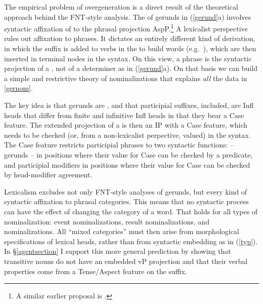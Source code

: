 \documentclass[output=paper,
modfonts
]{LSP/langsci}
\newcommand{\rf}[1]{(\ref{#1})}
\newcommand{\rfa}[2]{(\ref{#1}{#2})}
\begin{document}
The empirical problem of overgeneration is a direct result of the theoretical approach behind
the FNT-style analysis.  The  of gerunds in \rfa{gerund}{a} involves syntactic
affixation of  to the phrasal projection AspP.\footnote{A similar earlier proposal
  is \citet{yoon1996}.}  A lexicalist perspective rules out affixation to phrases.  It dictates an
entirely different kind of derivation, in which the  suffix  is added to
verbs in the  to build words (e.g.\ ), which are then inserted in
terminal nodes in the syntax.  On this view, a  phrase is the syntactic projection of a
, not of a determiner as in \rfa{gerund}{a}. On that basis we can build a simple and
restrictive theory of nominalizations that explains \textit{all} the data in \cref{gernom}.

The key idea is that gerunds are , and that participial suffixes, 
included, are Infl heads that differ from finite and infinitive Infl heads in that they bear a
Case feature.  The extended projection of a  is then an IP with a Case feature, which
needs to be checked (or, from a non-lexicalist perpective, valued) in the syntax.  The Case
feature restricts participial phrases to two syntactic functions:   – gerunds – in
positions where their value for Case can be checked by a predicate, and participial modifiers
in positions where their value for Case can be checked by head-modifier agreement.

Lexicalism excludes not only FNT-style analyses of gerunds, but every kind of syntactic
affixation to phrasal categories.  This means that no syntactic process can have the effect of
changing the category of a word.  That holds for all types of nominalization:  event
nominalizations, result nominalizations, and  nominalizations.
All ``mixed categories'' must then arise from morphological specifications of lexical heads,
rather than from syntactic embedding as in \rf{typ}.  In \S\ref{agentsection} I support
this more general prediction by showing that transitive  nouns do not have an embedded vP
projection and that their verbal properties come from a Tense/Aspect feature on the 
suffix.
\end{document}
